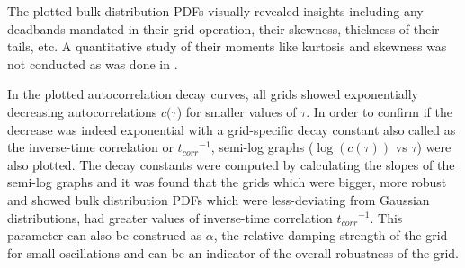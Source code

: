 The plotted bulk distribution PDFs visually revealed insights including any deadbands \cite{francesca01, vorobev01} mandated in their grid operation, their skewness, thickness of their tails, etc. A quantitative study of their moments like kurtosis and skewness was not conducted as was done in \cite{schafer01}.

In the plotted autocorrelation decay curves, all grids showed exponentially decreasing autocorrelations $c(\tau$) for smaller values of $\tau$. In order to confirm if the decrease was indeed exponential with a grid-specific decay constant also called as the inverse-time correlation or ${t_{corr}}^{-1}$, semi-log graphs ($\log(c(\tau))$ vs $\tau$) were also plotted. The decay constants were computed by calculating the slopes of the semi-log graphs and it was found that the grids which were bigger, more robust and showed bulk distribution PDFs which were less-deviating from Gaussian distributions, had greater values of inverse-time correlation ${t_{corr}}^{-1}$. This parameter can also be construed as $\alpha$, the relative damping strength of the grid for small oscillations and can be an indicator of the overall robustness of the grid.